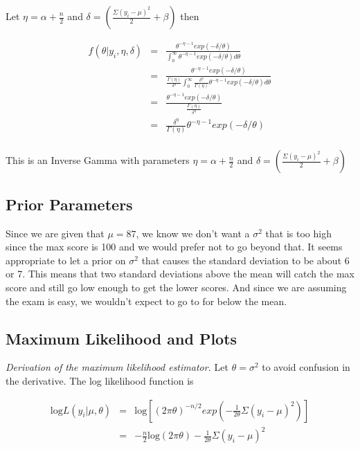 \documentclass[12pt]{article}
\begin{document}
\noindent Let $\eta=\alpha+\frac{n}{2}$ and $\delta=\left(\frac{\Sigma(y_i-\mu)^2}{2}+\beta\right)$ then

\begin{eqnarray*}
f(\theta|y_i,\eta,\delta) &=& \frac{\theta^{-\eta-1}exp(-\delta/\theta)}{\int_0^\infty\theta^{-\eta-1}exp(-\delta/\theta)d\theta} \\
&=& \frac{\theta^{-\eta-1}exp(-\delta/\theta)}{\frac{\Gamma(\eta)}{\delta^\eta}\int_0^\infty\frac{\delta^\eta}{\Gamma(\eta)}\theta^{-\eta-1}exp(-\delta/\theta)d\theta} \\
&=& \frac{\theta^{-\eta-1}exp(-\delta/\theta)}{\frac{\Gamma(\eta)}{\delta^\eta}} \\
&=& \frac{\delta^\eta}{\Gamma(\eta)}\theta^{-\eta-1}exp(-\delta/\theta) \\
\end{eqnarray*}

\noindent This is an Inverse Gamma with parameters $\eta=\alpha+\frac{n}{2}$ and $\delta=\left(\frac{\Sigma(y_i-\mu)^2}{2}+\beta\right)$

\subsection{Prior Parameters}

\noindent Since we are given that $\mu=87$, we know we don't want a $\sigma^2$ that is too high since the max score is 100 and we would prefer not to go beyond that.  It seems appropriate to let a prior on $\sigma^2$ that causes the standard deviation to be about 6 or 7.  This means that two standard deviations above the mean will catch the max score and still go low enough to get the lower scores.  And since we are assuming the exam is easy, we wouldn't expect to go to for below the mean.

\subsection{Maximum Likelihood and Plots}

\noindent \textit{Derivation of the maximum likelihood estimator.}  Let $\theta=\sigma^2$ to avoid confusion in the derivative.  The log likelihood function is

\begin{eqnarray*}
\mathrm{log}L(y_i|\mu,\theta) &=& \mathrm{log}\left[(2\pi\theta)^{-n/2}exp\left(-\frac{1}{2\theta}\Sigma(y_i-\mu)^2\right)\right] \\
&=& -\frac{n}{2}\mathrm{log}(2\pi\theta)-\frac{1}{2\theta}\Sigma(y_i-\mu)^2 \\
\end{eqnarray*}
\end{document}
